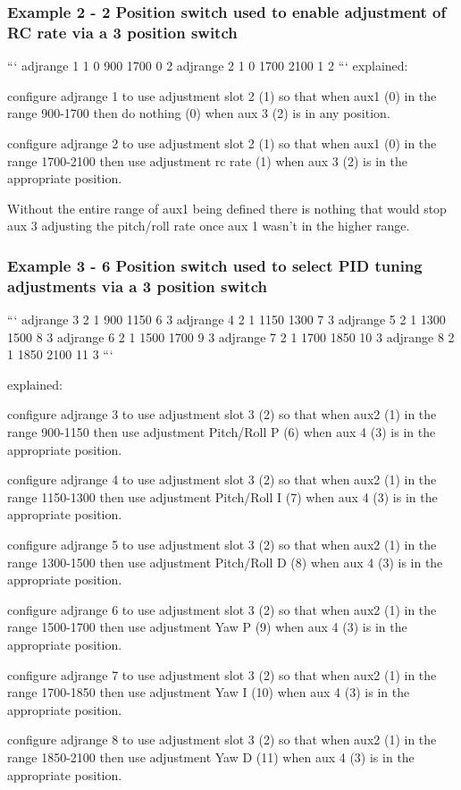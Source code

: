 \subsubsection*{Example 2 -\/ 2 Position switch used to enable adjustment of R\+C rate via a 3 position switch}

``` adjrange 1 1 0 900 1700 0 2 adjrange 2 1 0 1700 2100 1 2 ``` explained\+:


\begin{DoxyItemize}
\item configure adjrange 1 to use adjustment slot 2 (1) so that when aux1 (0) in the range 900-\/1700 then do nothing (0) when aux 3 (2) is in any position.
\item configure adjrange 2 to use adjustment slot 2 (1) so that when aux1 (0) in the range 1700-\/2100 then use adjustment rc rate (1) when aux 3 (2) is in the appropriate position.
\end{DoxyItemize}

Without the entire range of aux1 being defined there is nothing that would stop aux 3 adjusting the pitch/roll rate once aux 1 wasn't in the higher range.

\subsubsection*{Example 3 -\/ 6 Position switch used to select P\+I\+D tuning adjustments via a 3 position switch}

``` adjrange 3 2 1 900 1150 6 3 adjrange 4 2 1 1150 1300 7 3 adjrange 5 2 1 1300 1500 8 3 adjrange 6 2 1 1500 1700 9 3 adjrange 7 2 1 1700 1850 10 3 adjrange 8 2 1 1850 2100 11 3 ```

explained\+:


\begin{DoxyItemize}
\item configure adjrange 3 to use adjustment slot 3 (2) so that when aux2 (1) in the range 900-\/1150 then use adjustment Pitch/\+Roll P (6) when aux 4 (3) is in the appropriate position.
\item configure adjrange 4 to use adjustment slot 3 (2) so that when aux2 (1) in the range 1150-\/1300 then use adjustment Pitch/\+Roll I (7) when aux 4 (3) is in the appropriate position.
\item configure adjrange 5 to use adjustment slot 3 (2) so that when aux2 (1) in the range 1300-\/1500 then use adjustment Pitch/\+Roll D (8) when aux 4 (3) is in the appropriate position.
\item configure adjrange 6 to use adjustment slot 3 (2) so that when aux2 (1) in the range 1500-\/1700 then use adjustment Yaw P (9) when aux 4 (3) is in the appropriate position.
\item configure adjrange 7 to use adjustment slot 3 (2) so that when aux2 (1) in the range 1700-\/1850 then use adjustment Yaw I (10) when aux 4 (3) is in the appropriate position.
\item configure adjrange 8 to use adjustment slot 3 (2) so that when aux2 (1) in the range 1850-\/2100 then use adjustment Yaw D (11) when aux 4 (3) is in the appropriate position.
\end{DoxyItemize}


